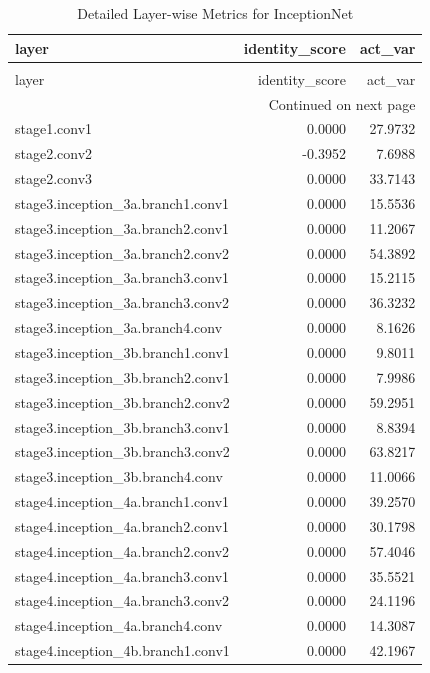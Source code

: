 \begin{longtable}{lrr}
\caption{Detailed Layer-wise Metrics for InceptionNet} \label{tab:layer_metrics_inceptionnet} \\
\toprule
layer & identity_score & act_var \\
\midrule
\endfirsthead
\caption[]{Detailed Layer-wise Metrics for InceptionNet} \\
\toprule
layer & identity_score & act_var \\
\midrule
\endhead
\midrule
\multicolumn{3}{r}{Continued on next page} \\
\midrule
\endfoot
\bottomrule
\endlastfoot
stage1.conv1 & 0.0000 & 27.9732 \\
stage2.conv2 & -0.3952 & 7.6988 \\
stage2.conv3 & 0.0000 & 33.7143 \\
stage3.inception_3a.branch1.conv1 & 0.0000 & 15.5536 \\
stage3.inception_3a.branch2.conv1 & 0.0000 & 11.2067 \\
stage3.inception_3a.branch2.conv2 & 0.0000 & 54.3892 \\
stage3.inception_3a.branch3.conv1 & 0.0000 & 15.2115 \\
stage3.inception_3a.branch3.conv2 & 0.0000 & 36.3232 \\
stage3.inception_3a.branch4.conv & 0.0000 & 8.1626 \\
stage3.inception_3b.branch1.conv1 & 0.0000 & 9.8011 \\
stage3.inception_3b.branch2.conv1 & 0.0000 & 7.9986 \\
stage3.inception_3b.branch2.conv2 & 0.0000 & 59.2951 \\
stage3.inception_3b.branch3.conv1 & 0.0000 & 8.8394 \\
stage3.inception_3b.branch3.conv2 & 0.0000 & 63.8217 \\
stage3.inception_3b.branch4.conv & 0.0000 & 11.0066 \\
stage4.inception_4a.branch1.conv1 & 0.0000 & 39.2570 \\
stage4.inception_4a.branch2.conv1 & 0.0000 & 30.1798 \\
stage4.inception_4a.branch2.conv2 & 0.0000 & 57.4046 \\
stage4.inception_4a.branch3.conv1 & 0.0000 & 35.5521 \\
stage4.inception_4a.branch3.conv2 & 0.0000 & 24.1196 \\
stage4.inception_4a.branch4.conv & 0.0000 & 14.3087 \\
stage4.inception_4b.branch1.conv1 & 0.0000 & 42.1967 \\

\end{longtable}
